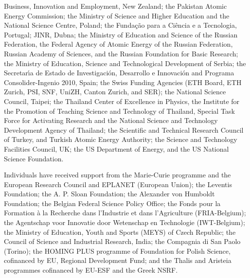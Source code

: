 \documentclass[journal]{IEEEtran}
\begin{document}
Business, Innovation and Employment, New Zealand; the Pakistan Atomic Energy Commission; the Ministry of Science and Higher Education and the National Science Centre, Poland; the Funda\c{c}\~ao para a Ci\^encia e a Tecnologia, Portugal; JINR, Dubna; the Ministry of Education and Science of the Russian Federation, the Federal Agency of Atomic Energy of the Russian Federation, Russian Academy of Sciences, and the Russian Foundation for Basic Research; the Ministry of Education, Science and Technological Development of Serbia; the Secretar\'{\i}a de Estado de Investigaci\'on, Desarrollo e Innovaci\'on and Programa Consolider-Ingenio 2010, Spain; the Swiss Funding Agencies (ETH Board, ETH Zurich, PSI, SNF, UniZH, Canton Zurich, and SER); the National Science Council, Taipei; the Thailand Center of Excellence in Physics, the Institute for the Promotion of Teaching Science and Technology of Thailand, Special Task Force for Activating Research and the National Science and Technology Development Agency of Thailand; the Scientific and Technical Research Council of Turkey, and Turkish Atomic Energy Authority; the Science and Technology Facilities Council, UK; the US Department of Energy, and the US National Science Foundation.

Individuals have received support from the Marie-Curie programme and the European Research Council and EPLANET (European Union); the Leventis Foundation; the A. P. Sloan Foundation; the Alexander von Humboldt Foundation; the Belgian Federal Science Policy Office; the Fonds pour la Formation \`a la Recherche dans l'Industrie et dans l'Agriculture (FRIA-Belgium); the Agentschap voor Innovatie door Wetenschap en Technologie (IWT-Belgium); the Ministry of Education, Youth and Sports (MEYS) of Czech Republic; the Council of Science and Industrial Research, India; the Compagnia di San Paolo (Torino); the HOMING PLUS programme of Foundation for Polish Science, cofinanced by EU, Regional Development Fund; and the Thalis and Aristeia programmes cofinanced by EU-ESF and the Greek NSRF.


\ifCLASSOPTIONcaptionsoff
  \newpage
\fi



\end{document}
